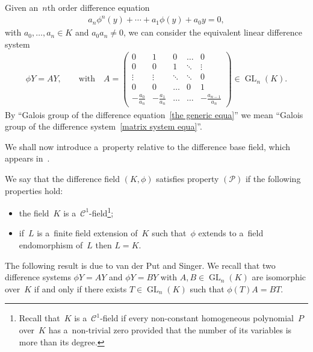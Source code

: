 \begin{Remark}
Given an~$n$th order dif\/ference equation
\begin{gather}
\label{the generic equa}
a_{n} \phi^{n} (y) + \cdots + a_{1} \phi(y)+a_{0} y=0,
\end{gather}
with $a_{0},\dots,a_{n} \in K$ and $a_{0}a_{n} \neq 0$, we can consider the equivalent linear dif\/ference system
\begin{gather}
\label{matrix system equa}
\phi Y=AY, \qquad \text{with} \quad  A=
\begin{pmatrix}
0&1&0&\dots&0
\\
0&0&1&\ddots&\vdots
\\
\vdots&\vdots&\ddots&\ddots&0
\\
0&0&\dots&0&1
\\
-\frac{a_{0}}{a_{n}}& -\frac{a_{1}}{a_{n}}&\dots & \dots & -\frac{a_{n-1}}{a_{n}}
\end{pmatrix}
\in \operatorname{GL}_{n}(K).
\end{gather}
By ``Galois group of the dif\/ference equation~\eqref{the generic equa}'' we mean ``Galois group of the dif\/ference
system~\eqref{matrix system equa}''.
\end{Remark}

We shall now introduce a~property relative to the dif\/ference base f\/ield, which appears in~\cite[Lemma~1.19]{VdPS97}.

\begin{Definition}
\label{prop P}
We say that the dif\/ference f\/ield $(K,\phi)$ satisf\/ies property $(\mathcal{P})$ if the following properties hold:
\begin{itemize}\itemsep=0pt
\item the f\/ield~$K$ is a~$\mathcal{C}^{1}$-f\/ield\footnote{Recall that~$K$ is a~$\mathcal{C}^{1}$-f\/ield if every
non-constant homogeneous polynomial~$P$ over~$K$ has a~non-trivial zero provided that the number of its variables is
more than its degree.};
\item if~$L$ is a~f\/inite f\/ield extension of~$K$ such that~$\phi$ extends to a~f\/ield endomorphism of~$L$ then $L=K$.
\end{itemize}
\end{Definition}

The following result is due to van der Put and Singer.
We recall that two dif\/ference systems $\phi Y=AY$ and $\phi Y=BY$ with $A,B \in \operatorname{GL}_{n}(K)$ are isomorphic
over~$K$ if and only if there exists $T \in \operatorname{GL}_{n}(K)$ such that $\phi(T) A=BT$.


